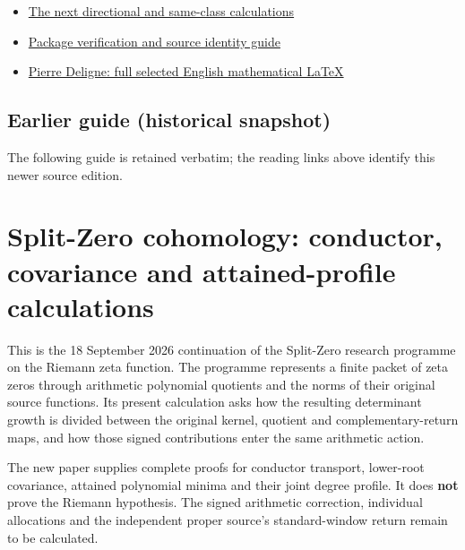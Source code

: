 \documentclass[
]{article}
\begin{document}
\begin{itemize}
{  PDF paired with its complete LaTeX}
\item
  \href{https://github.com/KokunoYumeto/zeta-function-research-reader/blob/main/workbenches/splitzero-tandem/continuations/20260919-arithmetic-signs-marked-classes/NEXT_CALCULATION.md}{The
  next directional and same-class calculations}
\item
  \href{https://github.com/KokunoYumeto/zeta-function-research-reader/blob/main/workbenches/splitzero-tandem/continuations/20260919-arithmetic-signs-marked-classes/PACKAGE_README.md}{Package
  verification and source identity guide}
\item
  \href{https://github.com/KokunoYumeto/zeta-function-research-reader/blob/main/workbenches/splitzero-tandem/continuations/20260919-arithmetic-signs-marked-classes/first_intake/supporting_sources/D032_FULL_EN.tex}{Pierre
  Deligne: full selected English mathematical LaTeX}
\end{itemize}

\subsection{Earlier guide (historical
snapshot)}\label{earlier-guide-historical-snapshot-2}

The following guide is retained verbatim; the reading links above
identify this newer source edition.

\section{Split-Zero cohomology: conductor, covariance and
attained-profile
calculations}\label{split-zero-cohomology-conductor-covariance-and-attained-profile-calculations}

This is the 18 September 2026 continuation of the Split-Zero research
programme on the Riemann zeta function. The programme represents a
finite packet of zeta zeros through arithmetic polynomial quotients and
the norms of their original source functions. Its present calculation
asks how the resulting determinant growth is divided between the
original kernel, quotient and complementary-return maps, and how those
signed contributions enter the same arithmetic action.

The new paper supplies complete proofs for conductor transport,
lower-root covariance, attained polynomial minima and their joint degree
profile. It does \textbf{not} prove the Riemann hypothesis. The signed
arithmetic correction, individual allocations and the independent proper
source's standard-window return remain to be calculated.
\end{document}
